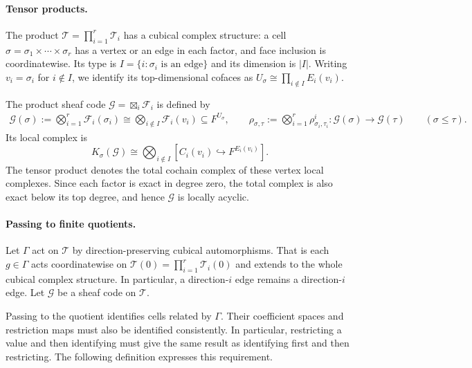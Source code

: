 \documentclass[11pt,letterpaper]{article}
\renewcommand{\le}{\leqslant}
\theoremstyle{definition}
\theoremstyle{remark}
\newcommand{\cF}{\mathcal F}
\begin{document}
\paragraph{Tensor products.}
The product $\mathcal T=\prod_{i=1}^r\mathcal T_i$ has a cubical complex structure: a cell $\sigma=\sigma_1\times\cdots\times\sigma_r$
has a vertex or an edge in each factor, and face inclusion is
coordinatewise. Its type is $I=\{i:\sigma_i\text{ is an edge}\}$
and its dimension is $|I|$. Writing $v_i=\sigma_i$ for $i\notin I$,
we identify its top-dimensional cofaces as
$U_\sigma\cong\prod_{i\notin I}E_i(v_i)$.

The product sheaf code $\mathcal G=\boxtimes_i\cF_i$ is defined by
\cite[Section~V]{PanteleevKalachev2024}
\[
 \begin{aligned}
 \mathcal G(\sigma):=\bigotimes_{i=1}^r\cF_i(\sigma_i)
       \cong\bigotimes_{i\notin I}\mathcal{F}_i(v_i)\subseteq F^{U_\sigma},\qquad
 \rho_{\sigma,\tau}:=\bigotimes_{i=1}^r\rho^i_{\sigma_i,\tau_i}:
 \mathcal G(\sigma)\longrightarrow\mathcal G(\tau)\qquad
(\sigma\le\tau).
 \end{aligned}
\]
Its local complex is
\begin{equation}
 K_\sigma(\mathcal G)\cong\bigotimes_{i\notin I}
 [C_i(v_i)\hookrightarrow F^{E_i(v_i)}].
 \label{eq:tree-code-local-model}
\end{equation}
The tensor product denotes the total cochain complex of
these vertex local complexes. Since each factor is exact in degree zero, the total complex is also exact below its top degree, and hence $\mathcal G$ is locally acyclic.

\paragraph{Passing to finite quotients.}
Let $\Gamma$ act on $\mathcal T$ by direction-preserving cubical
automorphisms. That is each $g\in\Gamma$ acts coordinatewise on $\mathcal T(0) = \prod_{i=1}^r \mathcal T_i(0)$ and extends to the whole cubical complex structure. In particular, a direction-$i$ edge remains a direction-$i$ edge. 
Let $\mathcal G$ be a sheaf code on $\mathcal T$.


Passing to the quotient identifies cells related by $\Gamma$.
Their coefficient spaces and restriction maps must also
be identified consistently. In particular, restricting
a value and then identifying must give the same result
as identifying first and then restricting.
The following definition expresses this requirement.
\end{document}
